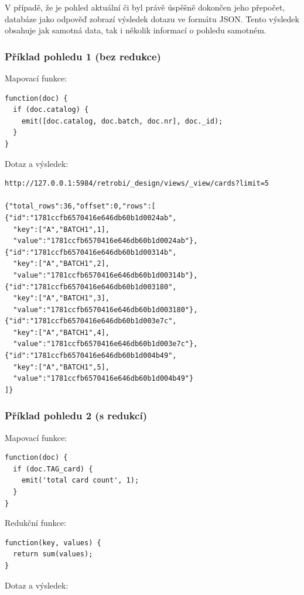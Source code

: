 V případě, že je pohled aktuální či byl právě úspěšně dokončen jeho přepočet, databáze jako odpověď zobrazí výsledek dotazu ve formátu JSON. Tento výsledek obsahuje jak samotná data, tak i několik informací o pohledu samotném.

\subsubsection{Příklad pohledu 1 (bez redukce)}

Mapovací funkce:

\begin{verbatim}
function(doc) {
  if (doc.catalog) {
    emit([doc.catalog, doc.batch, doc.nr], doc._id);  
  }
}
\end{verbatim}

Dotaz a výsledek:

\begin{verbatim}
http://127.0.0.1:5984/retrobi/_design/views/_view/cards?limit=5

{"total_rows":36,"offset":0,"rows":[
{"id":"1781ccfb6570416e646db60b1d0024ab",
  "key":["A","BATCH1",1],
  "value":"1781ccfb6570416e646db60b1d0024ab"},
{"id":"1781ccfb6570416e646db60b1d00314b",
  "key":["A","BATCH1",2],
  "value":"1781ccfb6570416e646db60b1d00314b"},
{"id":"1781ccfb6570416e646db60b1d003180",
  "key":["A","BATCH1",3],
  "value":"1781ccfb6570416e646db60b1d003180"},
{"id":"1781ccfb6570416e646db60b1d003e7c",
  "key":["A","BATCH1",4],
  "value":"1781ccfb6570416e646db60b1d003e7c"},
{"id":"1781ccfb6570416e646db60b1d004b49",
  "key":["A","BATCH1",5],
  "value":"1781ccfb6570416e646db60b1d004b49"}
]}
\end{verbatim}

\subsubsection{Příklad pohledu 2 (s redukcí)}

Mapovací funkce:

\begin{verbatim}
function(doc) {
  if (doc.TAG_card) {
    emit('total card count', 1);
  }
}
\end{verbatim}

Redukční funkce:

\begin{verbatim}
function(key, values) {
  return sum(values);
}
\end{verbatim}

Dotaz a výsledek:

